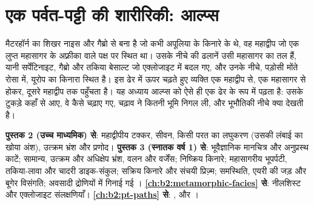 \chapter{एक पर्वत-पट्टी की शारीरिकी: आल्प्स}\label{ch:b2:alpine-orogen}

मैटरहॉर्न का शिखर नाइस और गैब्रो से बना है जो कभी अपूलिया के किनारे के थे,
वह महाद्वीप जो एक लुप्त महासागर के अफ़्रीका वाले पक्ष पर स्थित था। उसके नीचे की ढलानें
उसी महासागर का तल हैं, यानी सर्पेंटिनाइट, गैब्रो और तकिया बेसाल्ट जो एक्लोजाइट में बदल गए, और
उनके नीचे, पड़ोसी मोंते रोसा में, यूरोप का किनारा स्थित है। इस ढेर में ऊपर चढ़ते हुए
व्यक्ति एक महाद्वीप से, एक महासागर से होकर, दूसरे महाद्वीप तक पहुँचता है। यह अध्याय आल्प्स को ऐसे ही एक ढेर के रूप में पढ़ता है: उसके टुकड़े कहाँ से आए, वे कैसे
चढ़ाए गए, चढ़ाव ने कितनी भूमि निगल ली, और भूभौतिकी नीचे क्या देखती है।

\begin{recall}
\textbf{पुस्तक 2 (उच्च माध्यमिक) से}: महाद्वीपीय टक्कर, सीवन, किसी परत का
लघुकरण (उसकी लंबाई का खोया अंश), उत्क्रम भ्रंश और प्रणोद। \textbf{पुस्तक 3 (स्नातक वर्ष
1) से}: भूवैज्ञानिक मानचित्र और अनुप्रस्थ काटें; सामान्य, उत्क्रम और अधिक्षेप भ्रंश, वलन और
वर्जेंस; निष्क्रिय किनारे; महासागरीय भूपर्पटी, तकिया-लावा और चादरी डाइक-संकुल;
सक्रिय किनारे और संचयी प्रिज़्म; समस्थिति, एयरी की जड़ और बूगेर विसंगति;
अवसादी द्रोणियों में गिनाई गई । \textbf{\cref{ch:b2:metamorphic-facies}
से}: नीलशिस्ट और एक्लोजाइट संलक्षणियाँ। \textbf{\cref{ch:b2:pt-paths}
से}: ,  और ।
\end{recall}

